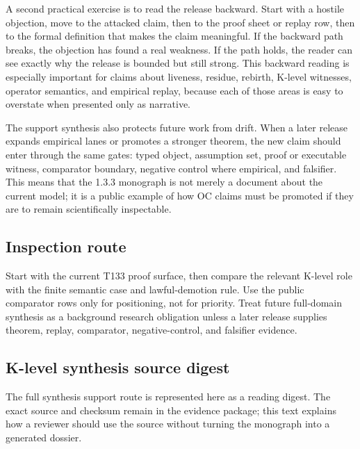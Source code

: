 A second practical exercise is to read the release backward. Start with a hostile objection, move to the attacked claim, then to the proof sheet or replay row, then to the formal definition that makes the claim meaningful. If the backward path breaks, the objection has found a real weakness. If the path holds, the reader can see exactly why the release is bounded but still strong. This backward reading is especially important for claims about liveness, residue, rebirth, K-level witnesses, operator semantics, and empirical replay, because each of those areas is easy to overstate when presented only as narrative.


The support synthesis also protects future work from drift. When a later release expands empirical lanes or promotes a stronger theorem, the new claim should enter through the same gates: typed object, assumption set, proof or executable witness, comparator boundary, negative control where empirical, and falsifier. This means that the 1.3.3 monograph is not merely a document about the current model; it is a public example of how OC claims must be promoted if they are to remain scientifically inspectable.


\subsection{Inspection route}

Start with the current T133 proof surface, then compare the relevant K-level role with the finite semantic case and lawful-demotion rule. Use the public comparator rows only for positioning, not for priority. Treat future full-domain synthesis as a background research obligation unless a later release supplies theorem, replay, comparator, negative-control, and falsifier evidence.


\subsection{K-level synthesis source digest}

The full synthesis support route is represented here as a reading digest. The exact source and checksum remain in the evidence package; this text explains how a reviewer should use the source without turning the monograph into a generated dossier.
